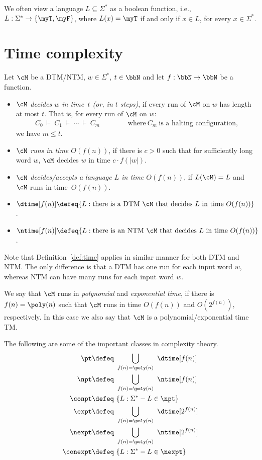\documentclass[11pt, a4paper]{article}
\begin{document}
We often view a language $L\subseteq \Sigma^*$ as a boolean function,
i.e., $L:\Sigma^*\to \{\myT,\myF\}$, where $L(x)=\myT$ if and only if $x\in L$,
for every $x\in \Sigma^*$.

\section{Time complexity}

\begin{definition}
\label{def:time}
Let $\cM$ be a DTM/NTM, $w\in \Sigma^*$, $t\in \bbN$ and let $f:\bbN\to\bbN$ be a function.
\begin{itemize}
\item 
{\em $\cM$ decides $w$ in time~$t$ (or, in $t$ steps)},
if every run of $\cM$ on $w$ has length at most $t$.
That is, for every run of $\cM$ on $w$:
\begin{eqnarray*}
C_0 \ \vdash \ C_1 \ \vdash \ \cdots \ \vdash \ C_m
& & \hspace{1cm}\mbox{where} \ C_m \ \mbox{is a halting configuration,}
\end{eqnarray*}
we have $m \leq t$.

\item
{\em $\cM$ runs in time $O(f(n))$}, if 
there is $c>0$ such that for sufficiently long word $w$,
$\cM$ decides $w$ in time $c\cdot f(|w|)$.
\item
{\em $\cM$ decides/accepts a language $L$ in time $O(f(n))$},
if $L(\cM)=L$ and $\cM$ runs in time~$O(f(n))$.
\item
$\dtime[f(n)] \defeq 
\{L  :  \text{there is a DTM}\ \cM \ \text{that decides} \ L \ \text{in time} \ O(f(n))\}$.
\item
$\ntime[f(n)] \defeq 
\{L  :  \text{there is an NTM}\ \cM \ \text{that decides} \ L \ \text{in time} \ O(f(n))\}$.
\end{itemize}
\end{definition}
Note that Definition~\ref{def:time} applies in similar manner for both DTM and NTM.
The only difference is that a DTM has one run for each input word $w$,
whereas NTM can have many runs for each input word $w$.
%

We say that $\cM$ runs in {\em polynomial} and {\em exponential time},
if there is $f(n)=\poly(n)$ such that $\cM$ runs in time $O(f(n))$ and $O(2^{f(n)})$, respectively.
In this case we also say that $\cM$ is a polynomial/exponential time TM.


The following are some of the important classes in complexity theory.
\begin{align*}
\pt & \defeq \ \bigcup_{f(n)=\poly(n)} \ \dtime[f(n)]
\\
\npt & \defeq \ \bigcup_{f(n)=\poly(n)} \ \ntime[f(n)]
\\
\conpt & \defeq \ \{L  :  \Sigma^{\ast}-L \in \npt\}
\\
\expt & \defeq \ \bigcup_{f(n)=\poly(n)} \ \dtime[2^{f(n)}]
\\
\nexpt & \defeq \ \bigcup_{f(n)=\poly(n)} \ \ntime[2^{f(n)}]
\\
\conexpt  & \defeq \ \{L :  \Sigma^{\ast}-L \in \nexpt\}
\end{align*}
\end{document}
